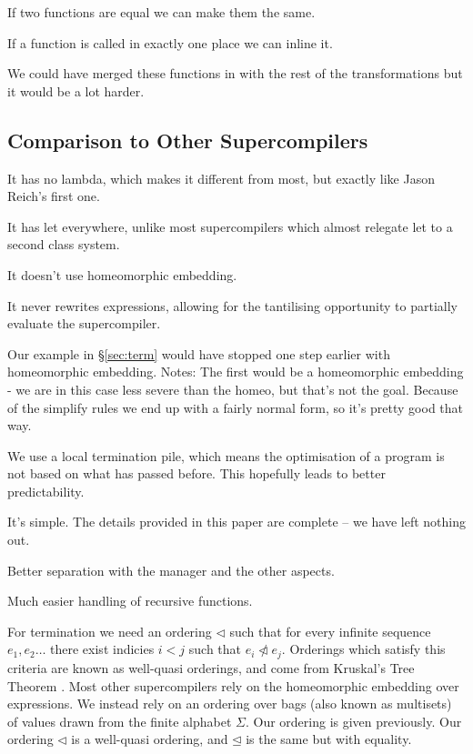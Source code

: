 \documentclass[draft]{sigplanconf}
\begin{document}
If two functions are equal we can make them the same.

If a function is called in exactly one place we can inline it.

We could have merged these functions in with the rest of the transformations but it would be a lot harder.

\subsection{Comparison to Other Supercompilers}
\label{sec:comparison}

It has no lambda, which makes it different from most, but exactly like Jason Reich's first one.

It has let everywhere, unlike most supercompilers which almost relegate let to a second class system.

It doesn't use homeomorphic embedding.

It never rewrites expressions, allowing for the tantilising opportunity to partially evaluate the supercompiler.

Our example in \S\ref{sec:term} would have stopped one step earlier with homeomorphic embedding. Notes: The first would be a homeomorphic embedding - we are in this case less severe than the homeo, but that's not the goal. Because of the simplify rules we end up with a fairly normal form, so it's pretty good that way.

We use a local termination pile, which means the optimisation of a program is not based on what has passed before. This hopefully leads to better predictability.

It's simple. The details provided in this paper are complete -- we have left nothing out.

Better separation with the manager and the other aspects.

Much easier handling of recursive functions.

For termination we need an ordering $\lhd$ such that for every infinite sequence $e_1,e_2 \ldots$ there exist indicies $i < j$ such that $e_i \ntriangleleft e_j$. Orderings which satisfy this criteria are known as well-quasi orderings, and come from Kruskal's Tree Theorem \cite{kruskal:tree}. Most other supercompilers rely on the homeomorphic embedding \cite{leuschel:homeomorphic} over expressions. We instead rely on an ordering over bags (also known as multisets) of values drawn from the finite alphabet $\Sigma$. Our ordering is given previously. Our ordering $\lhd$ is a well-quasi ordering, and $\unlhd$ is the same but with equality.
\end{document}

